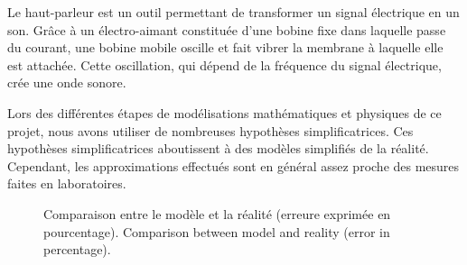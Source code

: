 

\begin{abstract-fr}
Le haut-parleur est un outil permettant de transformer un signal 
électrique en un son. Grâce à un électro-aimant constituée d'une 
bobine fixe dans laquelle passe du courant, une bobine mobile 
oscille et fait vibrer la membrane à laquelle elle est attachée. 
Cette oscillation, qui dépend de la fréquence du signal électrique, 
crée une onde sonore.

Lors des différentes étapes de modélisations mathématiques et physiques
de ce projet, nous avons utiliser de nombreuses hypothèses simplificatrices. 
Ces hypothèses simplificatrices aboutissent à des modèles simplifiés de la
réalité. Cependant, les approximations effectués sont en général assez proche
des mesures faites en laboratoires.
 
\end{abstract-fr}

\begin{figure}[ht]
	\centering
		\caption{Comparaison entre le modèle et la réalité (erreure exprimée en
		pourcentage). Comparison between model and reality (error in percentage).}
		\label{comparaison}
\end{figure}



